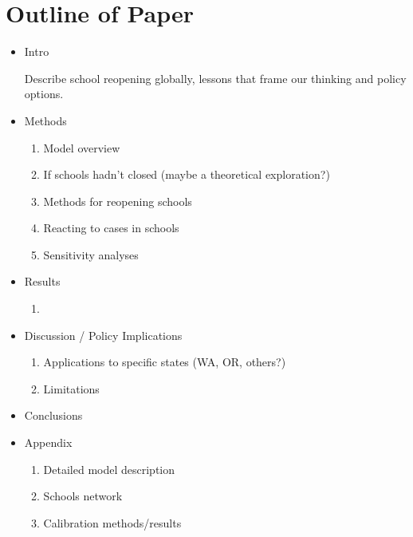 \documentclass{article}
\begin{document}
\section{Outline of Paper}
\begin{itemize}
    \item Intro
    
    Describe school reopening globally, lessons that frame our thinking and policy options.
    
    \item Methods
    \begin{enumerate}
        \item Model overview
        \item If schools hadn't closed (maybe a theoretical exploration?)
        \item Methods for reopening schools
        \item Reacting to cases in schools
        \item Sensitivity analyses
    \end{enumerate}
    \item Results
    \begin{enumerate}
        \item 
    \end{enumerate}
    \item Discussion / Policy Implications
    \begin{enumerate}
        \item Applications to specific states (WA, OR, others?)
        \item Limitations
    \end{enumerate}
    \item Conclusions
    \item Appendix
    \begin{enumerate}
        \item Detailed model description
        \item Schools network
        \item Calibration methods/results
    \end{enumerate}
\end{itemize}
\end{document}
